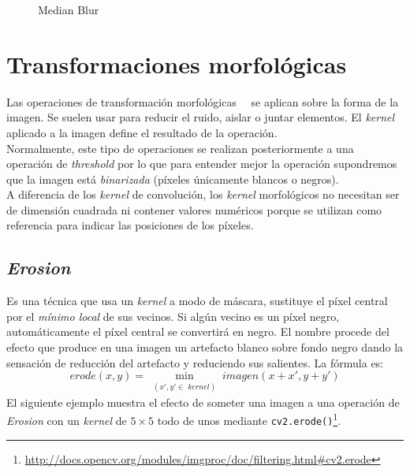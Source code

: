 \begin{figure}[H]
  \centering \setlength\fboxsep{0pt} \setlength\fboxrule{0.5pt}
  \caption{Median Blur}
\end{figure}

\section{Transformaciones morfológicas}
Las operaciones de transformación morfológicas~\emph{\citep*[9
  Morphology]{fisher1996hypermedia}}~\emph{\citep*[Image
  Morphology]{opencv_book-bib}} se aplican sobre la forma de la
imagen. Se suelen usar para reducir el ruido, aislar o juntar
elementos. El \emph{kernel} aplicado a la imagen define el
resultado de la operación. \\
Normalmente, este tipo de operaciones se realizan posteriormente a una
operación de \emph{threshold} por lo que para entender mejor la
operación supondremos que la imagen está \emph{binarizada} (píxeles
únicamente blancos o negros). \\
A diferencia de los \emph{kernel} de convolución, los \emph{kernel}
morfológicos no necesitan ser de dimensión cuadrada ni contener
valores numéricos porque se utilizan como referencia para indicar las
posiciones de los píxeles.

\subsection{\emph{Erosion}}
Es una técnica que usa un \emph{kernel} a modo de máscara, sustituye
el píxel central por el \emph{mínimo local} de sus vecinos. Si algún
vecino es un píxel negro, automáticamente el píxel central se
convertirá en negro. El nombre procede del efecto que produce en una
imagen un artefacto blanco sobre fondo negro dando la sensación de
reducción del artefacto y reduciendo sus salientes. La fórmula es:
\begin{equation*}
  erode(x, y) = \min_{\substack{(x', y' \in \; kernel)}} imagen(x + x', y + y')
\end{equation*}
El siguiente ejemplo muestra el efecto de someter una imagen a una
operación de \emph{Erosion} con un \emph{kernel} de $5 \times 5$ todo
de unos mediante \texttt{cv2.erode()}\footnote{\url{http://docs.opencv.org/modules/imgproc/doc/filtering.html\#cv2.erode}}.

